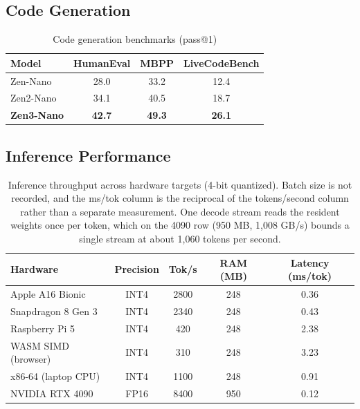 \documentclass[11pt,a4paper]{article}
\begin{document}
\subsection{Code Generation}

\begin{table}[H]
\centering
\caption{Code generation benchmarks (pass@1)}
\begin{tabular}{lccc}
\toprule
\textbf{Model} & \textbf{HumanEval} & \textbf{MBPP} & \textbf{LiveCodeBench} \\
\midrule
Zen-Nano     & 28.0 & 33.2 & 12.4 \\
Zen2-Nano    & 34.1 & 40.5 & 18.7 \\
\textbf{Zen3-Nano} & \textbf{42.7} & \textbf{49.3} & \textbf{26.1} \\
\bottomrule
\end{tabular}
\label{tab:code}
\end{table}

\subsection{Inference Performance}

\begin{table}[H]
\centering
\caption{Inference throughput across hardware targets (4-bit quantized). Batch size
is not recorded, and the ms/tok column is the reciprocal of the tokens/second column
rather than a separate measurement. One decode stream reads the resident weights once
per token, which on the 4090 row (950 MB, 1{,}008 GB/s) bounds a single stream at about
1{,}060 tokens per second.}
\begin{tabular}{lcccc}
\toprule
\textbf{Hardware} & \textbf{Precision} & \textbf{Tok/s} & \textbf{RAM (MB)} & \textbf{Latency (ms/tok)} \\
\midrule
Apple A16 Bionic      & INT4 & 2800 & 248 & 0.36 \\
Snapdragon 8 Gen 3    & INT4 & 2340 & 248 & 0.43 \\
Raspberry Pi 5        & INT4 &  420 & 248 & 2.38 \\
WASM SIMD (browser)   & INT4 &  310 & 248 & 3.23 \\
x86-64 (laptop CPU)   & INT4 & 1100 & 248 & 0.91 \\
NVIDIA RTX 4090       & FP16 & 8400 & 950 & 0.12 \\
\bottomrule
\end{tabular}
\label{tab:perf}
\end{table}
\end{document}
